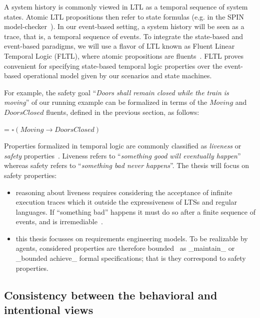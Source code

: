 A system history is commonly viewed in LTL as a temporal sequence of system states. Atomic LTL propositions then refer to state formulas (e.g. in the SPIN model-checker~\cite{Holzmann:1997}). In our event-based setting, a system history will be seen as a trace, that is, a temporal sequence of events. To integrate the state-based and event-based paradigms, we will use a flavor of LTL known as Fluent Linear Temporal Logic (FLTL), where atomic propositions are fluents~\cite{Giannakopoulou:2003}. FLTL proves convenient for specifying state-based temporal logic properties over the event-based operational model given by our scenarios and state machines. 

For example, the safety goal ``\emph{Doors shall remain closed while the train is moving}'' of our running example can be formalized in terms of the $Moving$ and $DoorsClosed$ fluents, defined in the previous section, as follows:

\begin{center}
 = $\square(Moving \rightarrow DoorsClosed)$
\end{center}

Properties formalized in temporal logic are commonly classified as \emph{liveness} or \emph{safety} properties~\cite{Alpern:1986}. Liveness refers to ``\emph{something good will eventually happen}'' whereas safety refers to  ``\emph{something bad never happens}''. The thesis will focus on safety properties:

\begin{itemize}
\item reasoning about liveness requires considering the acceptance of infinite execution traces which it outside the expressiveness of LTSs and regular languages. If ``something bad'' happens it must do so after a finite sequence of events, and is irremediable~\cite{Alpern:1986, Giannakopoulou:1999}.
\item this thesis focusses on requirements engineering models. To be realizable by agents, considered properties are therefore bounded~\cite{Letier:2002} as _maintain_ or _bounded achieve_ formal specifications; that is they correspond to safety properties.  
\end{itemize}

\subsection{Consistency between the behavioral and intentional views\label{subsection:background-goals-consistency}}

